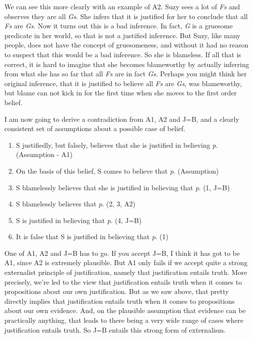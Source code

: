 \documentclass[
  11pt,
  letterpaper,
  DIV=11,
  numbers=noendperiod,
  oneside]{scrartcl}
\providecommand{\tightlist}{%
  \setlength{\itemsep}{0pt}\setlength{\parskip}{0pt}}\usepackage{longtable,booktabs,array}
\begin{document}
We can see this more clearly with an example of A2. Suzy sees a lot of
\emph{Fs} and observes they are all \emph{Gs}. She infers that it is
justified for her to conclude that all \emph{Fs} are \emph{Gs}. Now it
turns out this is a bad inference. In fact, \emph{G} is a gruesome
predicate in her world, so that is not a justified inference. But Suzy,
like many people, does not have the concept of gruesomeness, and without
it had no reason to suspect that this would be a bad inference. So she
is blameless. If all that is correct, it is hard to imagine that she
becomes blameworthy by actually inferring from what she has so far that
all \emph{Fs} are in fact \emph{Gs}. Perhaps you might think her
original inference, that it is justified to believe all \emph{Fs} are
\emph{Gs}, was blameworthy, but blame can not kick in for the first time
when she moves to the first order belief.

I am now going to derive a contradiction from A1, A2 and J=B, and a
clearly consistent set of assumptions about a possible case of belief.

\begin{enumerate}
\def\labelenumi{\arabic{enumi}.}
\tightlist
\item
  S justifiedly, but falsely, believes that she is justified in
  believing \emph{p}. (Assumption - A1)
\item
  On the basis of this belief, S comes to believe that \emph{p}.
  (Assumption)
\item
  S blamelessly believes that she is justified in believing that
  \emph{p}. (1, J=B)
\item
  S blamelessly believes that \emph{p}. (2, 3, A2)
\item
  S is justified in believing that \emph{p}. (4, J=B)
\item
  It is false that S is justified in believing that \emph{p}. (1)
\end{enumerate}

One of A1, A2 and J=B has to go. If you accept J=B, I think it has got
to be A1, since A2 is extremely plausible. But A1 only fails if we
accept quite a strong externalist principle of justification, namely
that justification entails truth. More precisely, we're led to the view
that justification entails truth when it comes to propositions about our
own justification. But as we saw above, that pretty directly implies
that justification entails truth when it comes to propositions about our
own evidence. And, on the plausible assumption that evidence can be
practically anything, that leads to there being a very wide range of
cases where justification entails truth. So J=B entails this strong form
of externalism.
\end{document}
